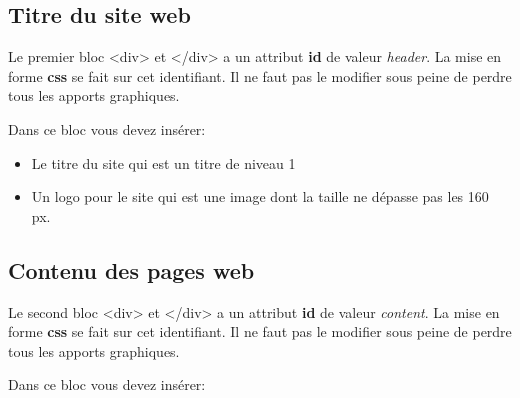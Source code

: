 \documentclass[11pt]{article}
\providecommand{\tightlist}{%
      \setlength{\itemsep}{0pt}\setlength{\parskip}{0pt}}
\begin{document}
\hypertarget{titre-du-site-web}{%
\subsection{Titre du site web}\label{titre-du-site-web}}

Le premier bloc \textless div\textgreater{} et
\textless/div\textgreater{} a un attribut \textbf{id} de valeur
\emph{header}. La mise en forme \textbf{css} se fait sur cet
identifiant. Il ne faut pas le modifier sous peine de perdre tous les
apports graphiques.

Dans ce bloc vous devez insérer:

\begin{itemize}
\tightlist
\item
  Le titre du site qui est un titre de niveau 1
\item
  Un logo pour le site qui est une image dont la taille ne dépasse pas
  les 160 px.
\end{itemize}

\hypertarget{contenu-des-pages-web}{%
\subsection{Contenu des pages web}\label{contenu-des-pages-web}}

Le second bloc \textless div\textgreater{} et
\textless/div\textgreater{} a un attribut \textbf{id} de valeur
\emph{content}. La mise en forme \textbf{css} se fait sur cet
identifiant. Il ne faut pas le modifier sous peine de perdre tous les
apports graphiques.

Dans ce bloc vous devez insérer:
\end{document}
